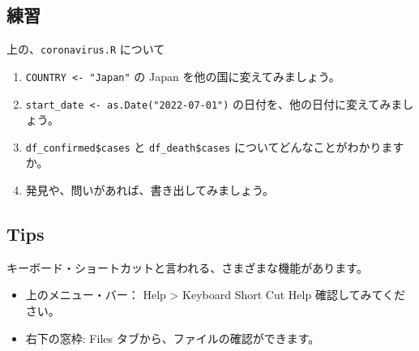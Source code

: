 \documentclass[
  xelatex, ja=standard]{bxjsbook}
\newenvironment{Shaded}{\begin{snugshade}}{\end{snugshade}}
\newcommand{\AttributeTok}[1]{\textcolor[rgb]{0.13,0.29,0.53}{#1}}
\newcommand{\DocumentationTok}[1]{\textcolor[rgb]{0.56,0.35,0.01}{\textbf{\textit{#1}}}}
\newcommand{\FunctionTok}[1]{\textcolor[rgb]{0.13,0.29,0.53}{\textbf{#1}}}
\newcommand{\NormalTok}[1]{#1}
\newcommand{\SpecialCharTok}[1]{\textcolor[rgb]{0.81,0.36,0.00}{\textbf{#1}}}
\newcommand{\StringTok}[1]{\textcolor[rgb]{0.31,0.60,0.02}{#1}}
\providecommand{\tightlist}{%
  \setlength{\itemsep}{0pt}\setlength{\parskip}{0pt}}
\theoremstyle{definition}
\theoremstyle{definition}
\theoremstyle{definition}
\theoremstyle{definition}
\theoremstyle{remark}
\begin{document}
\begin{Shaded}
\end{Shaded}

\hypertarget{ux7df4ux7fd2-2}{%
\subsection{練習}\label{ux7df4ux7fd2-2}}

上の、\texttt{coronavirus.R} について

\begin{enumerate}
\def\labelenumi{\arabic{enumi}.}
\tightlist
\item
  \texttt{COUNTRY\ \textless{}-\ "Japan"} の Japan を他の国に変えてみましょう。
\item
  \texttt{start\_date\ \textless{}-\ as.Date("2022-07-01")} の日付を、他の日付に変えてみましょう。
\item
  \texttt{df\_confirmed\$cases} と \texttt{df\_death\$cases} についてどんなことがわかりますか。
\item
  発見や、問いがあれば、書き出してみましょう。
\end{enumerate}

\hypertarget{tips}{%
\subsection{Tips}\label{tips}}

キーボード・ショートカットと言われる、さまざまな機能があります。

\begin{itemize}
\tightlist
\item
  上のメニュー・バー： Help \textgreater{} Keyboard Short Cut Help 確認してみてください。
\item
  右下の窓枠: Files タブから、ファイルの確認ができます。
\end{itemize}
\end{document}
